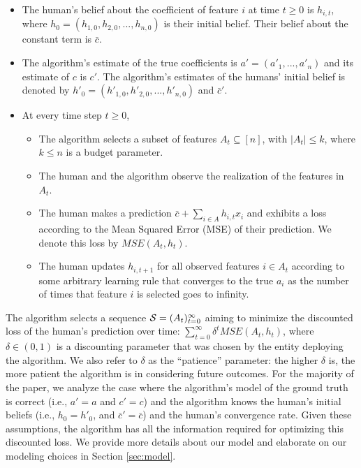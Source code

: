 \begin{itemize}
 \item The human's belief about the coefficient of feature $i$ at time $t\geq 0$ is $h_{i,t}$, where {$h_0 = (h_{1,0},h_{2,0}, ..., h_{n,0})$} is their initial belief. Their belief about the constant term is $\bar c$.
 \item The algorithm's estimate of the true coefficients is $a' = (a'_1,...,a'_n)$ and its estimate of $c$ is $c'$. The algorithm's estimates of the humans' initial belief is denoted by {$h'_0 = (h'_{1,0},h'_{2,0},...,h'_{n,0})$} and $\bar c'$.
 \item At every time step $t\geq 0$,
 \begin{itemize}
\item The algorithm selects a subset of features $A_t\subseteq[n]$, with $|A_t| \leq k$, where $k\leq n$ is a budget parameter.
\item The human and the algorithm observe the realization of the features in $A_t$.
\item The human makes a prediction $\bar c + \sum_{i \in A} h_{i,t} x_i$ and exhibits a loss according to the Mean Squared Error (MSE) of their prediction. We denote this loss by $MSE(A_t,h_t)$.
\item The human updates $h_{i,t+1}$ for all observed features $i\in A_t$ according to some arbitrary learning rule that converges to the true $a_i$ as the number of times that feature $i$ is selected goes to infinity. 
 \end{itemize}
\end{itemize}

The algorithm selects a sequence $\mathcal{S}=(A_t)_{t=0}^\infty$ {aiming} %
to minimize the discounted loss of the human's prediction over time: $\sum_{t=0}^\infty \delta^t MSE(A_t,h_t)$, where $\delta \in (0,1)$ is a discounting parameter that was chosen by the entity deploying the algorithm. We also refer to $\delta$ as the ``patience'' parameter: the higher $\delta$ is, the more patient the algorithm is in considering future outcomes. For the majority of the paper, we analyze the case where the algorithm's model of the ground truth is correct (i.e., $a'=a$ and $c'=c$) and the algorithm knows the human's initial beliefs (i.e., $h_0 = h'_0$, and $\bar c' = \bar c $) and the human's convergence rate. Given these assumptions, the algorithm has all the information required for optimizing this discounted loss. 
We provide more details about our model and elaborate on our modeling choices in Section \ref{sec:model}.

